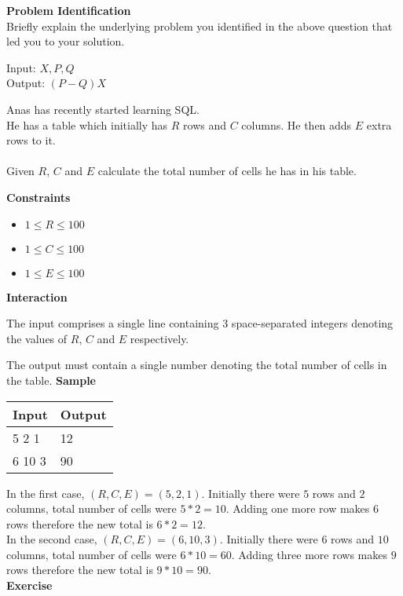 \documentclass[a4paper]{exam}
\newcommand\heading[1]{\textbf{#1}}
\begin{document}
\begin{questions}
    \heading{Problem Identification}\\
    Briefly explain the underlying problem you identified in the above question that led you to your solution.

    \begin{mdframed}
      Input: $X,P,Q$\\
      Output: $(P-Q)X$
    \end{mdframed}



    Anas has recently started learning SQL.
    \\
    He has a table which initially has $R$ rows and $C$ columns. He then adds $E$ extra rows to it.
    \\\\
    Given $R$, $C$ and $E$ calculate the total number of cells he has in his table.


    \heading{Constraints}
    \begin{itemize}
        \item $1 \le R \le 100$
        \item $1 \le C \le 100$
        \item $1 \le E \le 100$
    \end{itemize}


    \heading{Interaction}

    The input comprises a single line containing 3 space-separated integers denoting the values of $R$, $C$ and $E$ respectively.

    The output must contain a single number denoting the total number of cells in the table.
    \heading{Sample}

    \begin{tabularx}{\textwidth}{|X|X|}
        \rowcolor{gray!50}
        \hline
        Input  & Output \\ \hline\hline
        5 2 1  & 12     \\\hline
        6 10 3 & 90     \\\hline
    \end{tabularx}

    In the first case, $(R,C,E)=(5,2,1)$. Initially there were $5$ rows and $2$ columns, total number of cells were $5*2 = 10$. Adding one more row makes $6$ rows therefore the new total is $6*2=12$.
    \\
    In the second case, $(R,C,E)=(6,10,3)$. Initially there were $6$ rows and $10$ columns, total number of cells were $6*10 = 60$. Adding three more rows makes $9$ rows therefore the new total is $9*10=90$.
    \\
    \heading{Exercise}


\end{questions}
\end{document}
